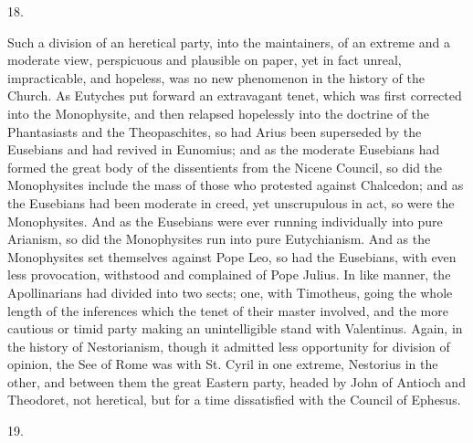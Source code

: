 18.

Such a division of an heretical party, into the maintainers, of an
extreme and a moderate view, perspicuous and plausible on paper, yet
in fact unreal, impracticable, and hopeless, was no new phenomenon in
the history of the Church. As Eutyches put forward an extravagant
tenet, which was first corrected into the Monophysite, and then
relapsed hopelessly into the doctrine of the Phantasiasts and the
Theopaschites, so had Arius been superseded by the Eusebians and had
revived in Eunomius; and as the moderate Eusebians had formed the
great body of the dissentients from the Nicene Council, so did the
Monophysites include the mass of those who protested against Chalcedon;
and as the Eusebians had been moderate in creed, yet unscrupulous in
act, so were the Monophysites. And as the Eusebians were ever running
individually into pure Arianism, so did the Monophysites run into pure
Eutychianism. And as the Monophysites set themselves against Pope Leo,
so had the Eusebians, with even less provocation, withstood and
complained of Pope Julius. In like manner, the Apollinarians had
divided into two sects; one, with Timotheus, going the whole length of
the inferences which the tenet of their master involved, and the more
cautious or timid party making an unintelligible stand with Valentinus.
Again, in the history of Nestorianism, though it admitted less
opportunity for division of opinion, the See of Rome was with St.
Cyril in one extreme, Nestorius in the other, and between them the
great Eastern party, headed by John of Antioch and Theodoret, not
heretical, but for a time dissatisfied with the Council of Ephesus.

19.

